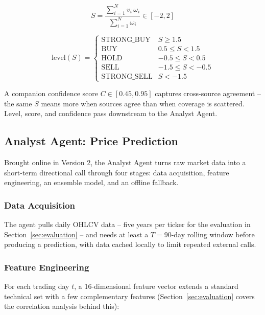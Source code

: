 \documentclass[conference]{IEEEtran}
\begin{document}
\begin{equation}
S = \frac{\sum_{i=1}^{N} v_i\,\omega_i}{\sum_{i=1}^{N} \omega_i} \in [-2,2]
\end{equation}

\begin{equation}
\mathrm{level}(S) =
\begin{cases}
\text{STRONG\_BUY} & S \geq 1.5 \\
\text{BUY} & 0.5 \leq S < 1.5 \\
\text{HOLD} & -0.5 \leq S < 0.5 \\
\text{SELL} & -1.5 \leq S < -0.5 \\
\text{STRONG\_SELL} & S < -1.5
\end{cases}
\label{eq:level-thresholds}
\end{equation}

A companion confidence score $C \in [0.45, 0.95]$ captures cross-source agreement -- the same $S$ means more when sources agree than when coverage is scattered. Level, score, and confidence pass downstream to the Analyst Agent.

\subsection{Analyst Agent: Price Prediction}

Brought online in Version 2, the Analyst Agent turns raw market data into a short-term directional call through four stages: data acquisition, feature engineering, an ensemble model, and an offline fallback.

\subsubsection{Data Acquisition}

The agent pulls daily OHLCV data -- five years per ticker for the evaluation in Section~\ref{sec:evaluation} -- and needs at least a $T=90$-day rolling window before producing a prediction, with data cached locally to limit repeated external calls.

\subsubsection{Feature Engineering}

For each trading day $t$, a 16-dimensional feature vector extends a standard technical set with a few complementary features (Section~\ref{sec:evaluation} covers the correlation analysis behind this):
\end{document}
